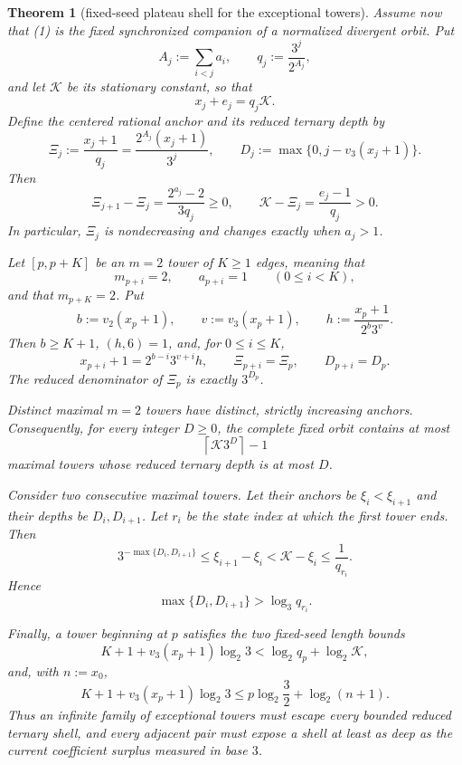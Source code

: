 \documentclass[11pt]{article}
\newtheorem{theorem}{Theorem}
\begin{document}
\begin{theorem}[fixed-seed plateau shell for the exceptional towers]
Assume now that (1) is the fixed synchronized companion of a normalized
divergent orbit.  Put
\[
  A_j:=\sum_{i<j}a_i,
  \qquad
  q_j:=\frac{3^j}{2^{A_j}},
  \tag{31}
\]
and let $\mathcal K$ be its stationary constant, so that
\[
  x_j+e_j=q_j\mathcal K.
  \tag{32}
\]
Define the centered rational anchor and its reduced ternary depth by
\[
  \Xi_j:=\frac{x_j+1}{q_j}
       =\frac{2^{A_j}(x_j+1)}{3^j},
  \qquad
  D_j:=\max\{0,j-v_3(x_j+1)\}.
  \tag{33}
\]
Then
\[
\boxed{
  \Xi_{j+1}-\Xi_j=\frac{2^{a_j}-2}{3q_j}\geq0,
  \qquad
  \mathcal K-\Xi_j=\frac{e_j-1}{q_j}>0.}
\tag{34}
\]
In particular, $\Xi_j$ is nondecreasing and changes exactly when $a_j>1$.

Let $[p,p+K]$ be an $m=2$ tower of $K\geq1$ edges, meaning that
\[
  m_{p+i}=2,
  \qquad
  a_{p+i}=1
  \qquad(0\leq i<K),
  \tag{35}
\]
and that $m_{p+K}=2$.  Put
\[
  b:=v_2(x_p+1),
  \qquad
  v:=v_3(x_p+1),
  \qquad
  h:=\frac{x_p+1}{2^b3^v}.
  \tag{36}
\]
Then $b\geq K+1$, $(h,6)=1$, and, for $0\leq i\leq K$,
\[
\boxed{
  x_{p+i}+1=2^{b-i}3^{v+i}h,
  \qquad
  \Xi_{p+i}=\Xi_p,
  \qquad
  D_{p+i}=D_p.}
\tag{37}
\]
The reduced denominator of $\Xi_p$ is exactly $3^{D_p}$.

Distinct maximal $m=2$ towers have distinct, strictly increasing anchors.
Consequently, for every integer $D\geq0$, the complete fixed orbit contains
at most
\[
\boxed{\left\lceil\mathcal K3^D\right\rceil-1}
\tag{38}
\]
maximal towers whose reduced ternary depth is at most $D$.

Consider two consecutive maximal towers.  Let their anchors be
$\xi_i<\xi_{i+1}$ and their depths be $D_i,D_{i+1}$.  Let $r_i$ be the
state index at which the first tower ends.  Then
\[
\boxed{
  3^{-\max\{D_i,D_{i+1}\}}
  \leq\xi_{i+1}-\xi_i
  <\mathcal K-\xi_i
  \leq\frac1{q_{r_i}}.}
\tag{39}
\]
Hence
\[
\boxed{
  \max\{D_i,D_{i+1}\}>\log_3 q_{r_i}.}
\tag{40}
\]

Finally, a tower beginning at $p$ satisfies the two fixed-seed length
bounds
\[
\boxed{
  K+1+v_3(x_p+1)\log_2 3
  <\log_2q_p+\log_2\mathcal K,}
\tag{41}
\]
and, with $n:=x_0$,
\[
\boxed{
  K+1+v_3(x_p+1)\log_2 3
  \leq p\log_2\frac32+\log_2(n+1).}
\tag{42}
\]
Thus an infinite family of exceptional towers must escape every bounded
reduced ternary shell, and every adjacent pair must expose a shell at least
as deep as the current coefficient surplus measured in base $3$.
\end{theorem}
\end{document}
